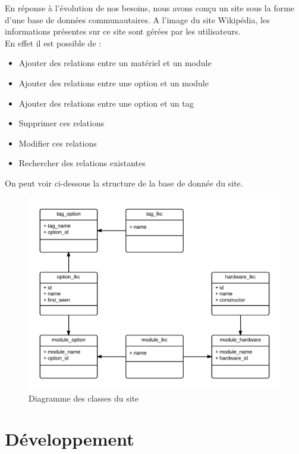 \documentclass[16pts]{report}
\begin{document}
    En réponse à l'évolution de nos besoins, nous avons conçu un site sous 
    la forme d'une base de données communautaires. A l'image du site 
    Wikipédia, les informations présentes sur ce site sont gérées par 
    les utilisateurs.\\

    En effet il est possible de : \\

    \begin{itemize}
        \item Ajouter des relations entre un matériel et un module
        \item Ajouter des relations entre une option et un module
        \item Ajouter des relations entre une option et un tag
        \item Supprimer ces relations
        \item Modifier ces relations
        \item Rechercher des relations existantes
    \end{itemize} 

    On peut voir ci-dessous la structure de la base de donnée du site. \\

    \begin{figure}[H]
        \includegraphics[scale=0.2]{./illustrations/diagramme_classes_site.png}
        \centering
        \caption{Diagramme des classes du site}
        \label{fig:DiagSite}
    \end{figure}


\chapter{Développement}
\label{cha:Développement}
\end{document}
